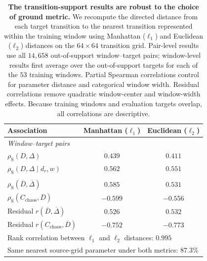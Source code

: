 \begin{table}[t]
  \centering
  \caption{\textbf{The transition-support results are robust to the choice of ground metric.}
  We recompute the directed distance from each target transition to the nearest
  transition represented within the training window using Manhattan
  ($\ell_1$) and Euclidean ($\ell_2$) distances on the $64\times64$
  transition grid. Pair-level results use all $14{,}658$ out-of-support
  window--target pairs; window-level results first average over the
  out-of-support targets for each of the $53$ training windows. Partial
  Spearman correlations control for parameter distance and categorical window
  width. Residual correlations remove quadratic window-center and window-width
  effects. Because training windows and evaluation targets overlap, all
  correlations are descriptive.}
  \label{tab:distance-metric-robustness}
  \small
  \setlength{\tabcolsep}{5pt}
  \begin{tabular}{lcc}
    \toprule
    Association & Manhattan ($\ell_1$) & Euclidean ($\ell_2$) \\
    \midrule
    \multicolumn{3}{l}{\emph{Window--target pairs}} \\
    $\rho_{\mathrm{S}}(D,\Delta)$
      & $0.439$ & $0.411$ \\
    $\rho_{\mathrm{S}}(D,\Delta\mid d_r,w)$
      & $0.562$ & $0.551$ \\
    \addlinespace
    \multicolumn{3}{l}{\emph{Window-level summaries}} \\
    $\rho_{\mathrm{S}}(\overline D,\overline\Delta)$
      & $0.585$ & $0.531$ \\
    $\rho_{\mathrm{S}}(C_{\mathrm{chaos}},\overline D)$
      & $-0.599$ & $-0.556$ \\
    Residual $r(\overline D,\overline\Delta)$
      & $0.526$ & $0.532$ \\
    Residual $r(C_{\mathrm{chaos}},\overline D)$
      & $-0.752$ & $-0.773$ \\
    \midrule
    \multicolumn{3}{l}{Rank correlation between $\ell_1$ and $\ell_2$ distances: $0.995$} \\
    \multicolumn{3}{l}{Same nearest source-grid parameter under both metrics: $87.3\%$} \\
    \bottomrule
  \end{tabular}
\end{table}
